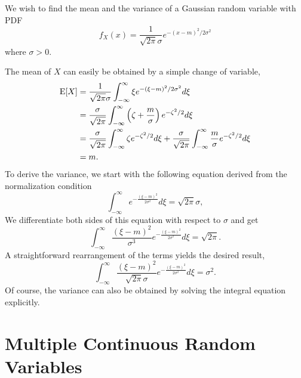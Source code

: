 \begin{example}
We wish to find the mean and the variance of a Gaussian random variable with PDF
\begin{equation*}
f_X (x) = \frac{1}{\sqrt{2 \pi} \sigma} e^{-(x-m)^2/2\sigma^2}
\end{equation*}
where $\sigma > 0$.

The mean of $X$ can easily be obtained by a simple change of variable,
\begin{equation*}
\begin{split}
\mathrm{E} [X]
&= \frac{1}{\sqrt{2 \pi} \sigma} \int_{- \infty}^{\infty} \xi e^{-(\xi-m)^2/2\sigma^2} d\xi \\
&= \frac{\sigma}{\sqrt{2 \pi}} \int_{- \infty}^{\infty}
\left( \zeta+\frac{m}{\sigma} \right) e^{-\zeta^2/2} d\xi \\
&= \frac{\sigma}{\sqrt{2 \pi}} \int_{- \infty}^{\infty}
\zeta e^{-\zeta^2/2} d\xi
+ \frac{\sigma}{\sqrt{2 \pi}} \int_{- \infty}^{\infty}
\frac{m}{\sigma} e^{-\zeta^2/2} d\xi \\
&= m.
\end{split}
\end{equation*}
To derive the variance, we start with the following equation derived from the normalization condition
\begin{equation*}
\int_{-\infty}^{\infty} e^{- \frac{(\xi-m)^2}{2 \sigma^2}} d\xi
= \sqrt{2 \pi} \sigma ,
\end{equation*}
We differentiate both sides of this equation with respect to $\sigma$ and get
\begin{equation*}
\int_{-\infty}^{\infty} \frac{(\xi-m)^2}{\sigma^3}
e^{- \frac{(\xi-m)^2}{2 \sigma^2}} d\xi
= \sqrt{2 \pi} .
\end{equation*}
A straightforward rearrangement of the terms yields the desired result,
\begin{equation*}
\int_{-\infty}^{\infty} \frac{(\xi-m)^2}{\sqrt{2 \pi} \sigma}
e^{- \frac{(\xi-m)^2}{2 \sigma^2}} d\xi
= \sigma^2 .
\end{equation*}
Of course, the variance can also be obtained by solving the integral equation explicitly.
\end{example}


\section{Multiple Continuous Random Variables}

